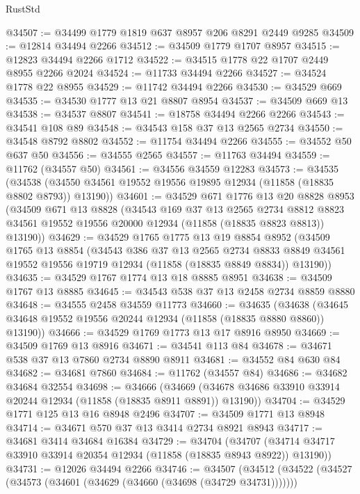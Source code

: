 \begin{lexlean}{RustStd}
\begin{coremodule}
@34507 := @34499 @1779 @1819 @637 @8957 @206 @8291 @2449 @9285
@34509 := @12814 @34494 @2266
@34512 := @34509 @1779 @1707 @8957
@34515 := @12823 @34494 @2266 @1712
@34522 := @34515 @1778 @22 @1707 @2449 @8955 @2266 @2024
@34524 := @11733 @34494 @2266
@34527 := @34524 @1778 @22 @8955
@34529 := @11742 @34494 @2266
@34530 := @34529 @669
@34535 := @34530 @1777 @13 @21 @8807 @8954
@34537 := @34509 @669 @13
@34538 := @34537 @8807
@34541 := @18758 @34494 @2266 @2266
@34543 := @34541 @108 @89
@34548 := @34543 @158 @37 @13 @2565 @2734
@34550 := @34548 @8792 @8802
@34552 := @11754 @34494 @2266
@34555 := @34552 @50 @637 @50
@34556 := @34555 @2565
@34557 := @11763 @34494
@34559 := @11762 (@34557 @50)
@34561 := @34556 @34559 @12283
@34573 := @34535
    (@34538 (@34550 @34561 @19552 @19556 @19895 @12934 (@11858 (@18835 @8802 @8793)) @13190))
@34601 := @34529
    @671
    @1776
    @13
    @20
    @8828
    @8953
    (@34509
      @671
      @13
      @8828
      (@34543
        @169
        @37
        @13
        @2565
        @2734
        @8812
        @8823
        @34561
        @19552
        @19556
        @20000
        @12934
        (@11858 (@18835 @8823 @8813))
        @13190))
@34629 := @34529
    @1765
    @1775
    @13
    @19
    @8854
    @8952
    (@34509
      @1765
      @13
      @8854
      (@34543
        @386
        @37
        @13
        @2565
        @2734
        @8833
        @8849
        @34561
        @19552
        @19556
        @19719
        @12934
        (@11858 (@18835 @8849 @8834))
        @13190))
@34635 := @34529 @1767 @1774 @13 @18 @8885 @8951
@34638 := @34509 @1767 @13 @8885
@34645 := @34543 @538 @37 @13 @2458 @2734 @8859 @8880
@34648 := @34555 @2458 @34559 @11773
@34660 := @34635
    (@34638 (@34645 @34648 @19552 @19556 @20244 @12934 (@11858 (@18835 @8880 @8860)) @13190))
@34666 := @34529 @1769 @1773 @13 @17 @8916 @8950
@34669 := @34509 @1769 @13 @8916
@34671 := @34541 @113 @84
@34678 := @34671 @538 @37 @13 @7860 @2734 @8890 @8911
@34681 := @34552 @84 @630 @84
@34682 := @34681 @7860
@34684 := @11762 (@34557 @84)
@34686 := @34682 @34684 @32554
@34698 := @34666
    (@34669 (@34678 @34686 @33910 @33914 @20244 @12934 (@11858 (@18835 @8911 @8891)) @13190))
@34704 := @34529 @1771 @125 @13 @16 @8948 @2496
@34707 := @34509 @1771 @13 @8948
@34714 := @34671 @570 @37 @13 @3414 @2734 @8921 @8943
@34717 := @34681 @3414 @34684 @16384
@34729 := @34704
    (@34707 (@34714 @34717 @33910 @33914 @20354 @12934 (@11858 (@18835 @8943 @8922)) @13190))
@34731 := @12026 @34494 @2266
@34746 := @34507
    (@34512
      (@34522
        (@34527 (@34573 (@34601 (@34629 (@34660 (@34698 (@34729 @34731)))))))

\end{coremodule}
\end{lexlean}
